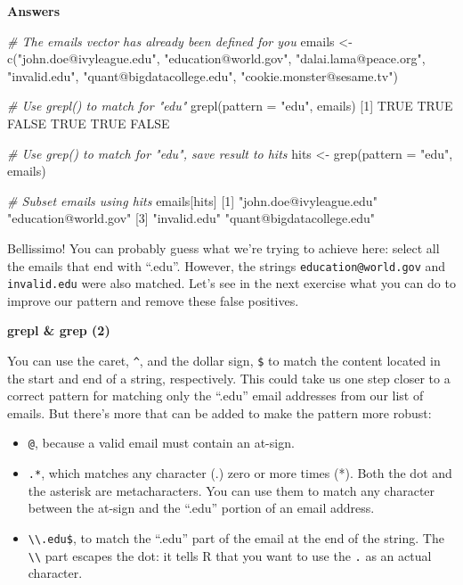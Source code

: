 \documentclass[]{article}
\providecommand{\tightlist}{%
  \setlength{\itemsep}{0pt}\setlength{\parskip}{0pt}}
\newcommand{\hlnum}[1]{\textcolor[rgb]{0.816,0.125,0.439}{#1}}%
\newcommand{\hlstr}[1]{\textcolor[rgb]{0.251,0.627,0.251}{#1}}%
\newcommand{\hlcom}[1]{\textcolor[rgb]{0.502,0.502,0.502}{\textit{#1}}}%
\newcommand{\hlstd}[1]{\textcolor[rgb]{0.251,0.251,0.251}{#1}}%
\newcommand{\hlkwc}[1]{\textcolor[rgb]{0.251,0.251,0.251}{#1}}%
\newcommand{\hlkwd}[1]{\textcolor[rgb]{0.878,0.439,0.125}{#1}}%
\newenvironment{Shaded}{\begin{myshaded}}{\end{myshaded}}
\newcommand{\KeywordTok}[1]{\hlkwd{#1}}
\newcommand{\DataTypeTok}[1]{\hlkwc{#1}}
\newcommand{\DecValTok}[1]{\hlnum{#1}}
\newcommand{\StringTok}[1]{\hlstr{#1}}
\newcommand{\CommentTok}[1]{\hlcom{#1}}
\newcommand{\OtherTok}[1]{{#1}}
\newcommand{\NormalTok}[1]{\hlstd{#1}}
\begin{document}
\textbf{Answers}

\begin{Shaded}
\begin{Highlighting}[]
\CommentTok{# The emails vector has already been defined for you}
\NormalTok{emails <-}\StringTok{ }\KeywordTok{c}\NormalTok{(}\StringTok{"john.doe@ivyleague.edu"}\NormalTok{, }\StringTok{"education@world.gov"}\NormalTok{, }\StringTok{"dalai.lama@peace.org"}\NormalTok{,}
            \StringTok{"invalid.edu"}\NormalTok{, }\StringTok{"quant@bigdatacollege.edu"}\NormalTok{, }\StringTok{"cookie.monster@sesame.tv"}\NormalTok{)}

\CommentTok{# Use grepl() to match for "edu"}
\KeywordTok{grepl}\NormalTok{(}\DataTypeTok{pattern =} \StringTok{"edu"}\NormalTok{, emails)}
\NormalTok{   [}\DecValTok{1}\NormalTok{]  }\OtherTok{TRUE}  \OtherTok{TRUE} \OtherTok{FALSE}  \OtherTok{TRUE}  \OtherTok{TRUE} \OtherTok{FALSE}

\CommentTok{# Use grep() to match for "edu", save result to hits}
\NormalTok{hits <-}\StringTok{ }\KeywordTok{grep}\NormalTok{(}\DataTypeTok{pattern =} \StringTok{"edu"}\NormalTok{, emails)}

\CommentTok{# Subset emails using hits}
\NormalTok{emails[hits]}
\NormalTok{   [}\DecValTok{1}\NormalTok{] }\StringTok{"john.doe@ivyleague.edu"}   \StringTok{"education@world.gov"}     
\NormalTok{   [}\DecValTok{3}\NormalTok{] }\StringTok{"invalid.edu"}              \StringTok{"quant@bigdatacollege.edu"}
\end{Highlighting}
\end{Shaded}

Bellissimo! You can probably guess what we're trying to achieve here:
select all the emails that end with ``.edu''. However, the strings
\texttt{education@world.gov} and \texttt{invalid.edu} were also matched.
Let's see in the next exercise what you can do to improve our pattern
and remove these false positives.

\textbf{grepl \& grep (2)}

You can use the caret, \texttt{\^{}}, and the dollar sign, \texttt{\$}
to match the content located in the start and end of a string,
respectively. This could take us one step closer to a correct pattern
for matching only the ``.edu'' email addresses from our list of emails.
But there's more that can be added to make the pattern more robust:

\begin{itemize}
\tightlist
\item
  \texttt{@}, because a valid email must contain an at-sign.
\item
  \texttt{.*}, which matches any character (.) zero or more times (*).
  Both the dot and the asterisk are metacharacters. You can use them to
  match any character between the at-sign and the ``.edu'' portion of an
  email address.
\item
  \texttt{\textbackslash{}\textbackslash{}.edu\$}, to match the ``.edu''
  part of the email at the end of the string. The
  \texttt{\textbackslash{}\textbackslash{}} part escapes the dot: it
  tells R that you want to use the \texttt{.} as an actual character.
\end{itemize}
\end{document}
